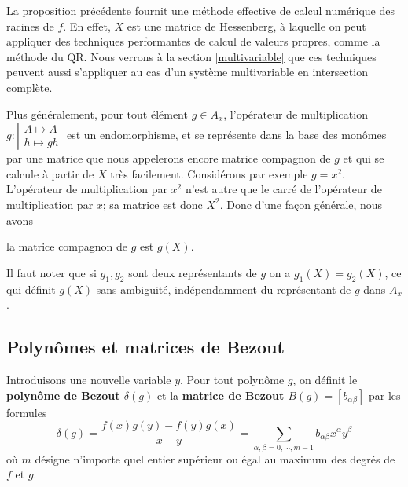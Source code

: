 \documentclass{standalone}
\begin{document}
\begin{rem}
La proposition précédente fournit une méthode effective de calcul numérique des racines de $f$. En effet, $X$ est une matrice de Hessenberg, à laquelle on peut appliquer des techniques performantes de calcul de valeurs propres, comme la méthode du QR. Nous verrons à la section \ref{multivariable} que ces techniques peuvent aussi s'appliquer au cas d'un système multivariable en intersection complète.
\end{rem}
Plus généralement, pour tout élément $g\in A_x$, l'opérateur de multiplication
$g : \left\vert
\begin{array}{c}
A \mapsto A \\
h \mapsto gh
\end{array}
\right.$
est un endomorphisme, et se représente dans la base des monômes par une matrice que nous appelerons encore matrice compagnon de $g$ et qui se calcule à partir de $X$ très facilement. Considérons par exemple $g = x^2$. L'opérateur de multiplication par $x^2$ n'est autre que le carré de l'opérateur de multiplication par $x$; sa matrice est donc $X^2$. Donc d'une façon générale, nous avons
\begin{prop}
la matrice compagnon de $g$ est $g(X)$.
\end{prop}

\begin{rem}
Il faut noter que si $g_1, g_2$ sont deux représentants de $g$ on a $g_1(X) = g_2(X)$, ce qui définit $g(X)$ sans ambiguité, indépendamment du représentant de $g$ dans $A_x$.
\end{rem}

\subsection{Polynômes et matrices de Bezout}
\begin{defn}
\label{def_bez}
Introduisons une nouvelle variable $y$.
Pour tout polynôme $g$, on définit le {\bf polynôme de Bezout $\delta(g)$} et la {\bf matrice de Bezout $B(g) = [b_{\alpha\beta}]$}  par les formules
\begin{equation}
\delta(g) = \dfrac{f(x)g(y)-f(y)g(x)}{x-y} = \sum_{\alpha,\beta = 0, \cdots, m-1} b_{\alpha\beta} x^\alpha y^\beta
\end{equation}
où $m$ désigne n'importe quel entier supérieur ou égal au maximum des degrés de $f$ et $g$.
\end{defn}
\end{document}
